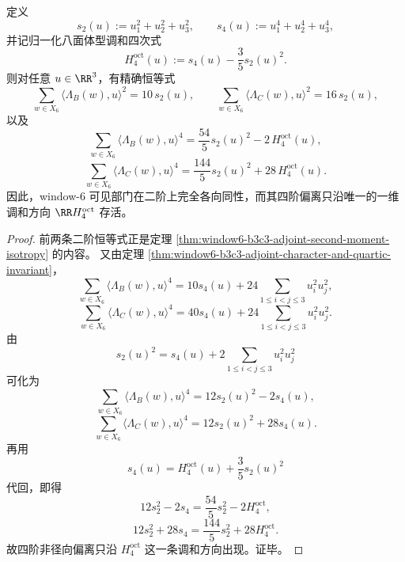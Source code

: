 \begin{theorem}\label{thm:window6-b3c3-quartic-defect-onedim}
定义
\[
s_2(u):=u_1^2+u_2^2+u_3^2,
\qquad
s_4(u):=u_1^4+u_2^4+u_3^4,
\]
并记归一化八面体型调和四次式
\[
H_4^{\mathrm{oct}}(u):=s_4(u)-\frac35 s_2(u)^2.
\]
则对任意 \(u\in \RR^3\)，有精确恒等式
\[
\sum_{w\in X_6}\langle \Lambda_B(w),u\rangle^2=10\,s_2(u),
\qquad
\sum_{w\in X_6}\langle \Lambda_C(w),u\rangle^2=16\,s_2(u),
\]
以及
\[
\sum_{w\in X_6}\langle \Lambda_B(w),u\rangle^4
=
\frac{54}{5}s_2(u)^2-2\,H_4^{\mathrm{oct}}(u),
\]
\[
\sum_{w\in X_6}\langle \Lambda_C(w),u\rangle^4
=
\frac{144}{5}s_2(u)^2+28\,H_4^{\mathrm{oct}}(u).
\]
因此，window-\(6\) 可见部门在二阶上完全各向同性，而其四阶偏离只沿唯一的一维调和方向 \(\RR H_4^{\mathrm{oct}}\) 存活。
\end{theorem}
\begin{proof}
前两条二阶恒等式正是定理 \ref{thm:window6-b3c3-adjoint-second-moment-isotropy} 的内容。
又由定理 \ref{thm:window6-b3c3-adjoint-character-and-quartic-invariant}，
\[
\sum_{w\in X_6}\langle \Lambda_B(w),u\rangle^4
=
10s_4(u)+24\sum_{1\le i<j\le 3}u_i^2u_j^2,
\]
\[
\sum_{w\in X_6}\langle \Lambda_C(w),u\rangle^4
=
40s_4(u)+24\sum_{1\le i<j\le 3}u_i^2u_j^2.
\]
由
\[
s_2(u)^2=s_4(u)+2\sum_{1\le i<j\le 3}u_i^2u_j^2
\]
可化为
\[
\sum_{w\in X_6}\langle \Lambda_B(w),u\rangle^4
=
12s_2(u)^2-2s_4(u),
\]
\[
\sum_{w\in X_6}\langle \Lambda_C(w),u\rangle^4
=
12s_2(u)^2+28s_4(u).
\]
再用
\[
s_4(u)=H_4^{\mathrm{oct}}(u)+\frac35 s_2(u)^2
\]
代回，即得
\[
12s_2^2-2s_4
=
\frac{54}{5}s_2^2-2H_4^{\mathrm{oct}},
\]
\[
12s_2^2+28s_4
=
\frac{144}{5}s_2^2+28H_4^{\mathrm{oct}}.
\]
故四阶非径向偏离只沿 \(H_4^{\mathrm{oct}}\) 这一条调和方向出现。证毕。
\end{proof}

